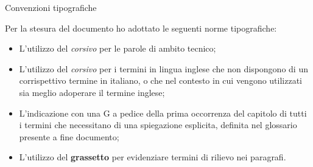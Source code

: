 
{}
{}
\begingroup
\let\clearpage\relax
\let\cleardoublepage\relax
\let\cleardoublepage\relax


\leavevmode	\newline
\leavevmode	\newline
\leavevmode	\newline
\begin{Huge}
Convenzioni tipografiche
\end{Huge}
\leavevmode	\newline

Per la stesura del documento ho adottato le seguenti norme tipografiche:\\

\begin{itemize}
	\item L'utilizzo del \textit{corsivo} per le parole di ambito tecnico;
	\item L'utilizzo del \textit{corsivo} per i termini in lingua inglese che non dispongono di un corrispettivo termine in italiano, o che nel contesto in cui vengono utilizzati sia meglio adoperare il termine inglese; 
	\item L'indicazione con una G a pedice della prima occorrenza del capitolo di tutti i termini che necessitano di una spiegazione esplicita, definita nel glossario presente a fine documento;
	\item L'utilizzo del \textbf{grassetto} per evidenziare termini di rilievo nei paragrafi.
\end{itemize}


%
%

\endgroup			


